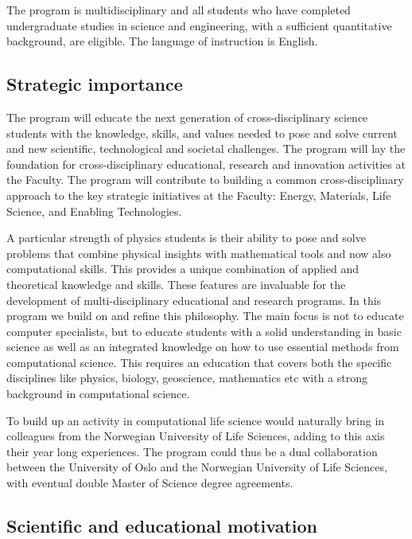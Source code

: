 \documentclass[%
oneside,                 %
final,                   %
10pt]{article}
\begin{document}
The program is multidisciplinary and all students who have completed
undergraduate studies in science and engineering, with a sufficient
quantitative background, are eligible.  The language of instruction is
English.



\subsection*{Strategic importance}

The program will educate the next generation of cross-disciplinary
science students with the knowledge, skills, and values needed to pose
and solve current and new scientific, technological and societal
challenges. The program will lay the foundation for cross-disciplinary
educational, research and innovation activities at the Faculty. The
program will contribute to building a common cross-disciplinary
approach to the key strategic initiatives at the Faculty: Energy,
Materials, Life Science, and Enabling Technologies.

A particular strength of physics students is their ability to pose and
solve problems that combine physical insights with mathematical tools
and now also computational skills. This provides a unique combination
of applied and theoretical knowledge and skills. These features are invaluable 
for the development of multi-disciplinary educational and research programs. 
In this program we build on and
refine this philosophy.  The main focus is not to educate computer
specialists, but to educate students with a solid understanding in basic science
as well as an integrated knowledge on how  to use 
essential methods from computational science. This requires an
education that covers both the specific disciplines like physics, biology,
geoscience, mathematics etc with a strong background in computational science.

To build up an activity in computational life science would naturally bring in colleagues from the Norwegian University of Life Sciences,
adding to this axis their year long experiences. 
The program could thus be a dual collaboration between the University of Oslo and the Norwegian University of Life Sciences, with eventual
double Master of Science degree agreements.

\subsection*{Scientific and educational motivation}
\end{document}
